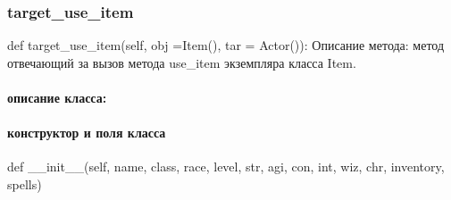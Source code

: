 \subsubsection{target\_use\_item}
def target\_use\_item(self, obj =Item(), tar = Actor()):
Описание метода: метод отвечающий за вызов метода use\_item экземпляра класса Item.	

\paragraph{описание класса:}
\paragraph{конструктор и поля класса}
def \_\_init\_\_(self, name, class, race, level, str, agi, con, int, wiz, chr, inventory, spells)
